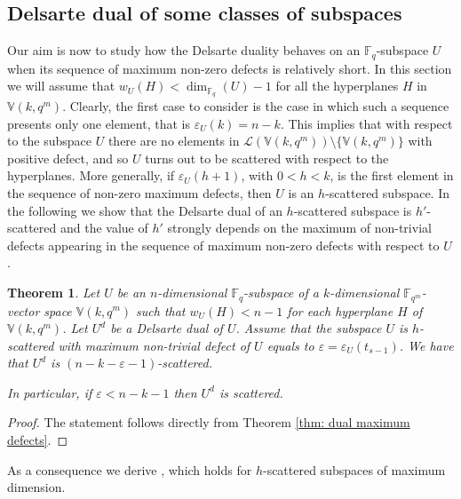 \documentclass[11pt]{amsart}
\newtheorem{theorem}{Theorem}[section]
\newcommand{\fqm}{\mathbb{F}_{q^m}}
\newcommand{\fq}{{\mathbb F}_{q}}
\begin{document}
\subsection{Delsarte dual of some classes of subspaces}

Our aim is now to study how the Delsarte duality behaves on an $\fq$-subspace $U$ when its sequence of maximum non-zero defects is relatively short.
In this section we will assume that $w_U(H)<\dim_{\fq}(U)-1$ for all the hyperplanes $H$ in $\mathbb{V}(k,q^m)$.
Clearly, the first case to consider is the case in which such a sequence presents only one element, that is $\varepsilon_U(k)=n-k$.
This implies that with respect to the subspace $U$ there are no elements in $\mathcal{L}(\mathbb{V}(k,q^m))\setminus \{\mathbb{V}(k,q^m)\}$ with positive defect, and so $U$ turns out to be scattered with respect to the hyperplanes.
More generally, if $\varepsilon_U(h+1)$, with $0<h<k$, is the first element in the sequence of non-zero maximum defects, then $U$ is an $h$-scattered subspace. In the following we show that the Delsarte dual of an $h$-scattered subspace is $h'$-scattered and the value of $h'$ strongly depends on the maximum of non-trivial defects appearing in the sequence of maximum non-zero defects with respect to $U$.

\begin{theorem}\label{prop:chardualhscatt}
    Let $U$ be an $n$-dimensional $\fq$-subspace of a $k$-dimensional $\fqm$-vector space $\mathbb{V}(k,q^m)$ such that $w_{{U}}(H)< n-1$ for each hyperplane $H$  of $\mathbb{V}(k,q^m)$. Let $U^d$ be a Delsarte dual of $U$.
    Assume that the subspace $U$ is $h$-scattered with  maximum non-trivial defect of $U$ equals to $\varepsilon=\varepsilon_U(t_{s-1})$. We have that $U^d$ is $(n-k-\varepsilon-1)$-scattered.
    
    In particular, if $\varepsilon<n-k-1$ then $U^d$ is scattered.
\end{theorem}
\begin{proof}
    The statement follows directly from Theorem \ref{thm: dual maximum defects}.
\end{proof}

As a consequence we derive \cite[Theorem 3.3]{csajbok2021generalising}, which holds for $h$-scattered subspaces of maximum dimension.
\end{document}
